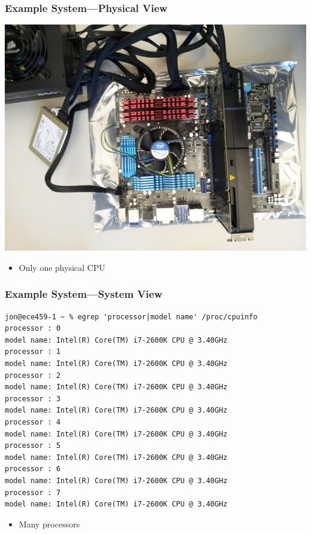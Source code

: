 \begin{frame}[fragile]
  \frametitle{Example System---Physical View}
  
  \begin{center}
  \includegraphics[scale=0.25]{images/computer-parts}
  \end{center}

  \begin{itemize}
    \item Only one physical CPU
  \end{itemize}
\end{frame}

\begin{frame}[fragile]
  \frametitle{Example System---System View}

  \scriptsize
  \begin{lstlisting}
jon@ece459-1 ~ % egrep 'processor|model name' /proc/cpuinfo 
processor : 0
model name: Intel(R) Core(TM) i7-2600K CPU @ 3.40GHz
processor : 1
model name: Intel(R) Core(TM) i7-2600K CPU @ 3.40GHz
processor : 2
model name: Intel(R) Core(TM) i7-2600K CPU @ 3.40GHz
processor : 3
model name: Intel(R) Core(TM) i7-2600K CPU @ 3.40GHz
processor : 4
model name: Intel(R) Core(TM) i7-2600K CPU @ 3.40GHz
processor : 5
model name: Intel(R) Core(TM) i7-2600K CPU @ 3.40GHz
processor : 6
model name: Intel(R) Core(TM) i7-2600K CPU @ 3.40GHz
processor : 7
model name: Intel(R) Core(TM) i7-2600K CPU @ 3.40GHz
  \end{lstlisting}

  \begin{itemize}
    \item Many processors
  \end{itemize}
\end{frame}


